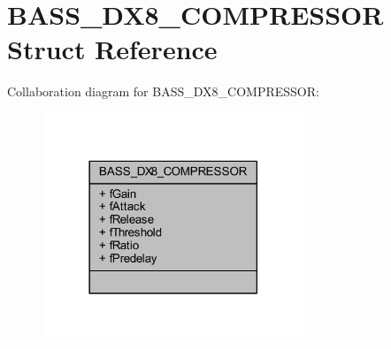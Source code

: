\hypertarget{struct_b_a_s_s___d_x8___c_o_m_p_r_e_s_s_o_r}{\section{B\-A\-S\-S\-\_\-\-D\-X8\-\_\-\-C\-O\-M\-P\-R\-E\-S\-S\-O\-R Struct Reference}
\label{struct_b_a_s_s___d_x8___c_o_m_p_r_e_s_s_o_r}
}


Collaboration diagram for B\-A\-S\-S\-\_\-\-D\-X8\-\_\-\-C\-O\-M\-P\-R\-E\-S\-S\-O\-R\-:\nopagebreak
\begin{figure}[H]
\begin{center}
\leavevmode
\includegraphics[width=222pt]{struct_b_a_s_s___d_x8___c_o_m_p_r_e_s_s_o_r__coll__graph}
\end{center}
\end{figure}
